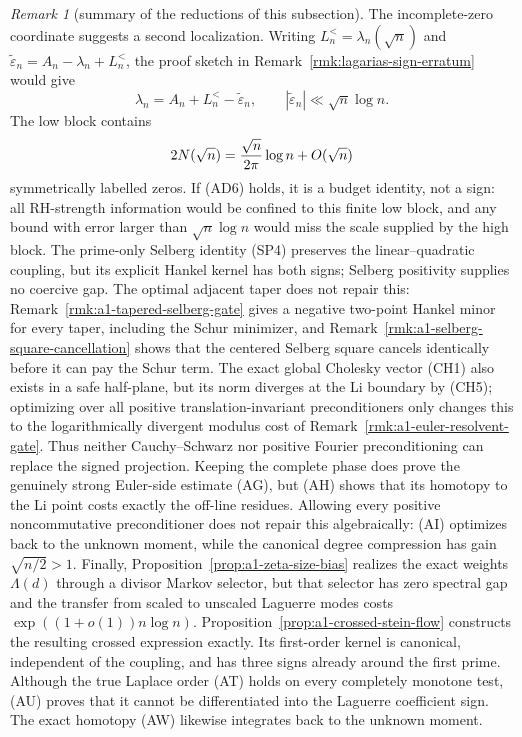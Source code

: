 \documentclass[11pt]{amsart}
\theoremstyle{definition}
\theoremstyle{remark}
\newtheorem{remark}[theorem]{Remark}
\theoremstyle{definition}
\begin{document}
\begin{remark}[summary of the reductions of this subsection]
The incomplete-zero coordinate suggests a second localization.
Writing $L_n^<=\lambda_n(\sqrt n)$ and
$\widetilde\varepsilon_n=A_n-\lambda_n+L_n^<$, the proof sketch
in Remark~\ref{rmk:lagarias-sign-erratum} would give
\[
 \lambda_n=A_n+L_n^<-\widetilde\varepsilon_n,
 \qquad |\widetilde\varepsilon_n|\ll\sqrt n\log n.          \tag{AD6}
\]
The low block contains
\[
 2N(\sqrt n)={\sqrt n\over2\pi}\log n+O(\sqrt n)
\]
symmetrically labelled zeros.  If (AD6) holds, it is a budget identity,
not a sign: all RH-strength information would be confined to this finite
low block, and any bound with error larger than $\sqrt n\log n$ would miss
the scale supplied by the high block.
The prime-only Selberg identity (SP4) preserves the linear--quadratic coupling, but its explicit
Hankel kernel has both signs; Selberg positivity supplies no coercive gap.  The optimal adjacent
taper does not repair this: Remark~\ref{rmk:a1-tapered-selberg-gate} gives a negative two-point
Hankel minor for every taper, including the Schur minimizer, and
Remark~\ref{rmk:a1-selberg-square-cancellation} shows that the centered Selberg square cancels
identically before it can pay the Schur term.  The exact global
Cholesky vector (CH1) also exists in a safe half-plane, but its norm diverges at the Li boundary by
(CH5); optimizing over all positive translation-invariant preconditioners only changes this to the
logarithmically divergent modulus cost of Remark~\ref{rmk:a1-euler-resolvent-gate}.  Thus neither
Cauchy--Schwarz nor positive Fourier preconditioning can replace the signed projection.  Keeping the
complete phase does prove the genuinely strong Euler-side estimate (AG), but (AH) shows that its
homotopy to the Li point costs exactly the off-line residues.  Allowing every positive
noncommutative preconditioner does not repair this algebraically: (AI) optimizes back to the unknown
moment, while the canonical degree compression has gain $\sqrt{n/2}>1$.  Finally,
Proposition~\ref{prop:a1-zeta-size-bias} realizes the exact weights $\Lambda(d)$ through a divisor
Markov selector, but that selector has zero spectral gap and the transfer from scaled to unscaled
Laguerre modes costs $\exp((1+o(1))n\log n)$.  Proposition~\ref{prop:a1-crossed-stein-flow}
constructs the resulting crossed expression exactly.  Its first-order kernel is canonical, independent
of the coupling, and has three signs already around the first prime.  Although the true Laplace order
(AT) holds on every completely monotone test, (AU) proves that it cannot be differentiated into the
Laguerre coefficient sign.  The exact homotopy (AW) likewise integrates back to the unknown moment.

\end{remark}
\end{document}

